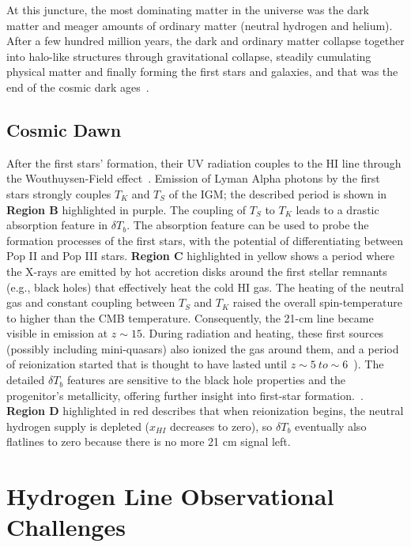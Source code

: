 At this juncture, the most dominating matter in the universe was the dark matter and meager amounts of ordinary matter (neutral hydrogen and helium). After a few hundred million years, the dark and ordinary matter collapse together into halo-like structures through gravitational collapse, steadily cumulating physical matter and finally forming the first stars and galaxies, and that was the end of the cosmic dark ages~\citep{2003Sci...300.1904M}.

\subsection{Cosmic Dawn}

After the first stars' formation, their UV radiation couples to the HI line through the Wouthuysen-Field effect~\citep{2012RPPh...75h6901P}. Emission of Lyman Alpha photons by the first stars strongly couples $T_K$ and $T_S$ of the IGM; the described period is shown in \textbf{Region B} highlighted in purple. The coupling of $T_S$ to $T_K$ leads to a drastic absorption feature in $\delta T_b$. The absorption feature can be used to probe the formation processes of the first stars, with the potential of differentiating between Pop II and Pop III stars. \textbf{Region C} highlighted in yellow shows a period where the X-rays are emitted by hot accretion disks around the first stellar remnants (e.g., black holes) that effectively heat the cold HI gas. The heating of the neutral gas and constant coupling between $T_S$ and $T_K$ raised the overall spin-temperature to higher than the CMB temperature. Consequently, the 21-cm line became visible in emission at $z\sim15$. During radiation and heating, these first sources (possibly including mini-quasars) also ionized the gas around them, and a period of reionization started that is thought to have lasted until $z\sim5~to\sim 6$~\citep{2015aska.confE...1K}). The detailed $\delta T_b$ features are sensitive to the black hole properties and the progenitor's metallicity, offering further insight into first-star formation.~\citep{11}. \textbf{Region D} highlighted in red describes that when reionization begins, the neutral hydrogen supply is depleted ($x_{HI}$ decreases to zero), so $\delta T_b$ eventually also flatlines to zero because there is no more 21 cm signal left. 

\section{Hydrogen Line Observational Challenges}

